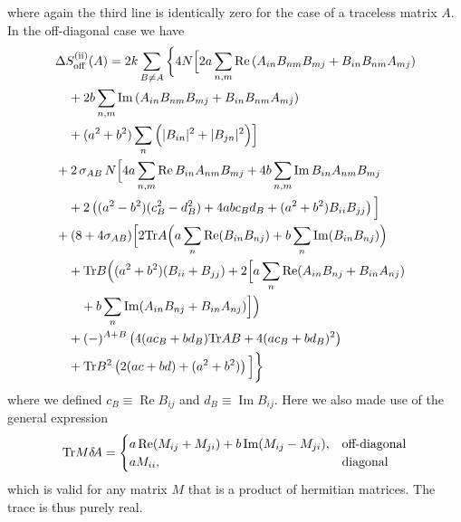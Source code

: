 \documentclass[10pt,a4paper]{article}
\newcommand{\RN}[1]{%
    \textup{\uppercase\expandafter{\romannumeral#1}}%
}
\newcommand{\Tr}{\mathrm{Tr}\vspace{-2pt}}
\newcommand{\deltaA}{\delta \! A}
\begin{document}
where again the third line is identically zero for the case of a
traceless matrix $A$. In the off-diagonal case we have
\begin{align}
  &\Delta S^{(\RN{2})}_{\mathrm{off}} (A) =
  2k \sum_{B \neq A} \bigg\{ 4N \Big[
      2a \sum_{n,m} \operatorname{Re}
      \left( A_{in} B_{nm} B_{mj} + B_{in} B_{nm} A_{mj} \right)\\
      &\quad+ 2b \sum_{n,m} \operatorname{Im}
      \left( A_{in} B_{nm} B_{mj} + B_{in} B_{nm} A_{mj} \right)\\
      &\quad+ (a^2 + b^2) \sum_n \Big( |B_{in}|^2 + |B_{jn}|^2 \Big)
  \Big]\\
  &+ 2 \,  \sigma_{AB} \, N   \Big[
    4a \sum_{n,m} \operatorname{Re} B_{in} A_{nm} B_{mj}
    +4b \sum_{n,m} \operatorname{Im} B_{in} A_{nm} B_{mj} \\
    &\quad+
    2 \left(
      (a^2-b^2)(c_B^2-d_B^2) + 4abc_B d_B + (a^2+b^2) B_{ii} B_{jj}
    \right)
  \Big]\\
  &+ (8+4\sigma_{AB}) \Big[
    2 \Tr A \Big(
      a \sum_n \operatorname{Re} (B_{in} B_{nj})
      +b \sum_n \operatorname{Im} (B_{in} B_{nj})
          \Big) \\
    &\quad+ \Tr B \Big(
      (a^2+b^2)(B_{ii}+B_{jj}) + 2 \Big[
        a \sum_n \operatorname{Re} (A_{in} B_{nj} + B_{in} A_{nj}) \\
        &\quad\quad+b \sum_n \operatorname{Im} (A_{in} B_{nj} + B_{in} A_{nj})
      \Big] \Big) \\
      &\quad+ (-)^{A+B} \left(
       4 (ac_B+bd_B) \Tr AB + 4(ac_B+bd_B)^2
     \right) \\
   &\quad+ \Tr B^2 \left( 2(ac+bd)+(a^2+b^2) \right)
  \Big]
 \bigg\}
\end{align}
where we defined $c_B \equiv \operatorname{Re} B_{ij}$ and
$d_B \equiv \operatorname{Im} B_{ij}$.
Here we also made use of the general expression
\begin{align}
  \Tr M \deltaA =
  \begin{cases}
    a \operatorname{Re} (M_{ij} + M_{ji})
    +b \operatorname{Im} (M_{ij} - M_{ji}), &\text{off-diagonal}\\
    a M_{ii}, &\text{diagonal}
  \end{cases}
\end{align}
which is valid for any matrix $M$ that is a product of hermitian matrices.
The trace is thus purely real.
\end{document}

